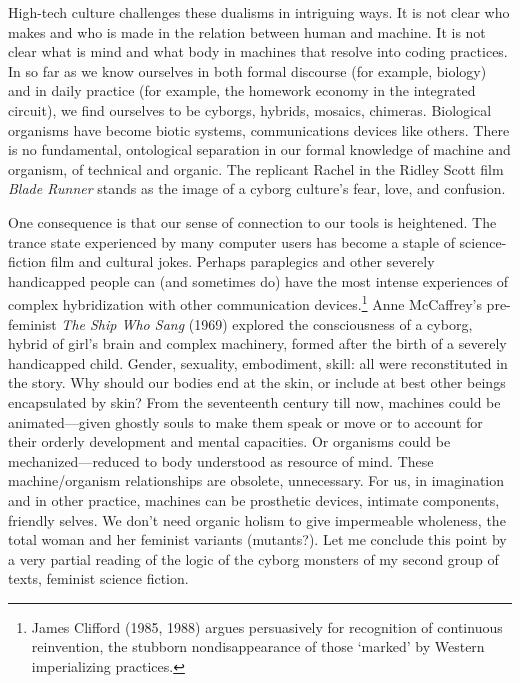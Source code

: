 \documentclass[DIV=12,%
               BCOR=10mm,%
               headinclude=false,%
               footinclude=false,open=any,%
               fontsize=11pt,%
               twoside,%
               paper=210mm:11in]%
               {scrbook}
\newcommand*{\Slash}{\slash\hspace{0pt}}
\begin{document}
High-tech culture challenges these dualisms in intriguing ways. It is not clear who makes and who is made in the relation between human and machine. It is not clear what is mind and what body in machines that resolve into coding practices. In so far as we know ourselves in both formal discourse (for example, biology) and in daily practice (for example, the homework economy in the integrated circuit), we find ourselves to be cyborgs, hybrids, mosaics, chimeras. Biological organisms have become biotic systems, communications devices like others. There is no fundamental, ontological separation in our formal knowledge of machine and organism, of technical and organic. The replicant Rachel in the Ridley Scott film \emph{Blade Runner} stands as the image of a cyborg culture’s fear, love, and confusion.


One consequence is that our sense of connection to our tools is heightened. The trance state experienced by many computer users has become a staple of science-fiction film and cultural jokes. Perhaps paraplegics and other severely handicapped people can (and sometimes do) have the most intense experiences of complex hybridization with other communication devices.\footnote{James Clifford (1985, 1988) argues persuasively for recognition of continuous reinvention, the stubborn nondisappearance of those ‘marked’ by Western imperializing practices.} Anne McCaffrey’s pre-feminist \emph{The Ship Who Sang} (1969) explored the consciousness of a cyborg, hybrid of girl’s brain and complex machinery, formed after the birth of a severely handicapped child. Gender, sexuality, embodiment, skill: all were reconstituted in the story. Why should our bodies end at the skin, or include at best other beings encapsulated by skin? From the seventeenth century till now, machines could be animated—given ghostly souls to make them speak or move or to account for their orderly development and mental capacities. Or organisms could be mechanized—reduced to body understood as resource of mind. These machine\Slash{}organism relationships are obsolete, unnecessary. For us, in imagination and in other practice, machines can be prosthetic devices, intimate components, friendly selves. We don’t need organic holism to give impermeable wholeness, the total woman and her feminist variants (mutants?). Let me conclude this point by a very partial reading of the logic of the cyborg monsters of my second group of texts, feminist science fiction.
\end{document}

